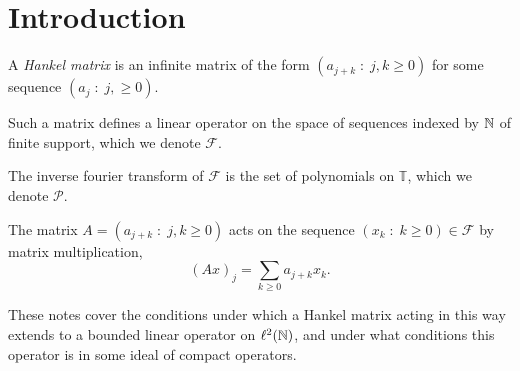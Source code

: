 \documentclass{unswmaths}
\begin{document}
\subject{}
\author{}
\title{}
\studentno{}


\newcommand{\Real}{\operatorname{Re}}
\newcommand{\Img}{\operatorname{Im}}
\newcommand{\lan}{\langle}
\newcommand{\ran}{\rangle}
\newcommand{\Proj}{\mathbb{P}}
\newcommand{\isom}{\cong}
\newcommand{\id}{{\operatorname{id}}}
\newcommand{\ha}{\boldsymbol{m}}
\newcommand{\Circ}{\mathbb{T}}
\newcommand{\BMO}{{BMO}}
\newcommand{\sgn}{\operatorname{sgn}}
\newcommand{\Diff}{\mathcal{D}}
\newcommand{\pvint}{\mathrm{p.v.}\int}
\newcommand{\BMOA}{{BMOA}}

\section*{Introduction}
    A \emph{Hankel matrix} is an infinite matrix of the form $(a_{j+k}\;:\;j,k\geq 0)$ for some 
    sequence $(a_j\;:\;j,\geq 0)$.
    
    Such a matrix defines a linear operator on the space of sequences indexed by $\mathbb{N}$ of finite support,
    which we denote $\mathcal{F}$.
    
    The inverse fourier transform of $\mathcal{F}$ is the set of polynomials on $\Circ$,
    which we denote $\mathcal{P}$.
    
    The matrix $A = (a_{j+k}\;:\;j,k\geq 0)$ acts on the sequence $(x_k\;:\;k\geq 0) \in \mathcal{F}$ by matrix
    multiplication,
    \begin{equation*}
        (Ax)_j = \sum_{k\geq 0} a_{j+k}x_k.
    \end{equation*}
    
    These notes cover the conditions under which a Hankel matrix acting in this way extends to a bounded linear
    operator on $\ell^2(\mathbb{N})$, and under what conditions this operator is in some ideal of
    compact operators.
    
    
    
\end{document}
